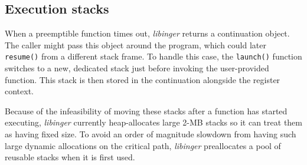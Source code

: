 \subsection{Execution stacks}

When a preemptible function times out, \textit{libinger} returns a
continuation object.  The caller might pass this object around the program, which
could later \texttt{resume()} from a different stack frame.  To handle this case, the
\texttt{launch()} function switches to a new, dedicated stack just
before invoking the user-provided function.  This stack is then stored in the
continuation alongside the register context.

Because of the infeasibility of moving these stacks after a function has started
executing, \textit{libinger} currently heap-allocates large 2-MB stacks so it can
treat them as having fixed size.  To avoid an order of magnitude slowdown from having
such large dynamic allocations on the critical path, \textit{libinger} preallocates a
pool of reusable stacks when it is first used.
